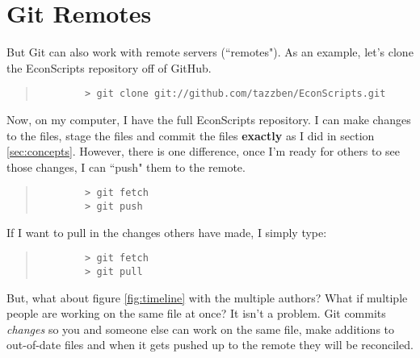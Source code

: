\section{Git Remotes}

But Git can also work with remote servers (``remotes").  As an example, let's clone the EconScripts repository off of GitHub.

\begin{quote}
	\begin{verbatim}
		> git clone git://github.com/tazzben/EconScripts.git
	\end{verbatim}
\end{quote}

Now, on my computer, I have the full EconScripts repository.  I can make changes to the files, stage the files and commit the files \textbf{exactly} as I did in section \ref{sec:concepts}.  However, there is one difference, once I'm ready for others to see those changes, I can ``push" them to the remote.

\begin{quote}
	\begin{verbatim}
		> git fetch
		> git push
	\end{verbatim}
\end{quote}

If I want to pull in the changes others have made, I simply type:

\begin{quote}
	\begin{verbatim}
		> git fetch
		> git pull
	\end{verbatim}
\end{quote}

But, what about figure \ref{fig:timeline} with the multiple authors?  What if multiple people are working on the same file at once?  It isn't a problem.  Git commits \emph{changes} so you and someone else can work on the same file, make additions to out-of-date files and when it gets pushed up to the remote they will be reconciled.   